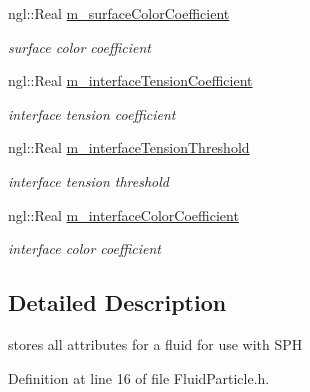 \begin{DoxyCompactItemize}
ngl::Real \hyperlink{class_fluid_particle_a1bafc97f79f73eed857df1bbba79a3b8}{m\_\-surfaceColorCoefficient}
\begin{DoxyCompactList}\small\item\em surface color coefficient \item\end{DoxyCompactList}\item 
ngl::Real \hyperlink{class_fluid_particle_ae649e3f7dcf63da1d3fb15c5c00c968d}{m\_\-interfaceTensionCoefficient}
\begin{DoxyCompactList}\small\item\em interface tension coefficient \item\end{DoxyCompactList}\item 
ngl::Real \hyperlink{class_fluid_particle_a654e0edda2cb46780451fd98e0613211}{m\_\-interfaceTensionThreshold}
\begin{DoxyCompactList}\small\item\em interface tension threshold \item\end{DoxyCompactList}\item 
ngl::Real \hyperlink{class_fluid_particle_ab50ddf6727d5869c5732efe8a59b549d}{m\_\-interfaceColorCoefficient}
\begin{DoxyCompactList}\small\item\em interface color coefficient \item\end{DoxyCompactList}\end{DoxyCompactItemize}


\subsection{Detailed Description}
stores all attributes for a fluid for use with SPH 

Definition at line 16 of file FluidParticle.h.



